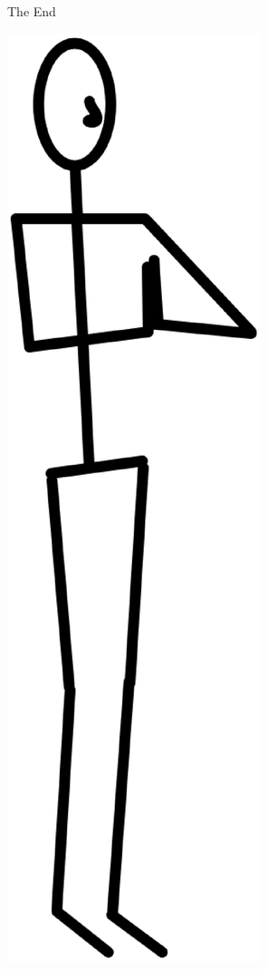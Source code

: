 \documentclass{beamer}
\begin{document}
\begin{frame}
  \Huge{\centerline{The End}}

  \includegraphics[width=0.2\linewidth]{SS_Mountain}
\end{frame}

\end{document}
